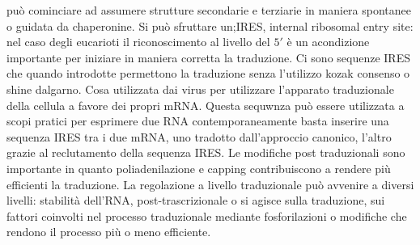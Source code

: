 pu\`o cominciare ad assumere strutture secondarie e terziarie in maniera spontanee o guidata da chaperonine. Si pu\`o sfruttare un;IRES, internal ribosomal entry site: nel caso degli
eucarioti il riconoscimento al livello del $5'$ \`e un acondizione importante per iniziare in maniera corretta la traduzione. Ci sono sequenze IRES che quando introdotte permettono
la traduzione senza l'utilizzo kozak consenso o shine dalgarno. Cosa utilizzata dai virus per utilizzare l'apparato traduzionale della cellula a favore dei propri mRNA. Questa sequwnza
pu\`o essere utilizzata a scopi pratici per esprimere due RNA contemporaneamente basta inserire una sequenza IRES tra i due mRNA, uno tradotto dall'approccio canonico, l'altro grazie
al reclutamento della sequenza IRES. Le modifiche post traduzionali sono importante in quanto poliadenilazione e capping contribuiscono a rendere pi\`u efficienti la traduzione. La
regolazione a livello traduzionale pu\`o avvenire a diversi livelli: stabilit\`a dell'RNA, post-trascrizionale o si agisce sulla traduzione, sui fattori coinvolti nel processo 
traduzionale mediante fosforilazioni o modifiche che rendono il processo pi\`u o meno efficiente. 
